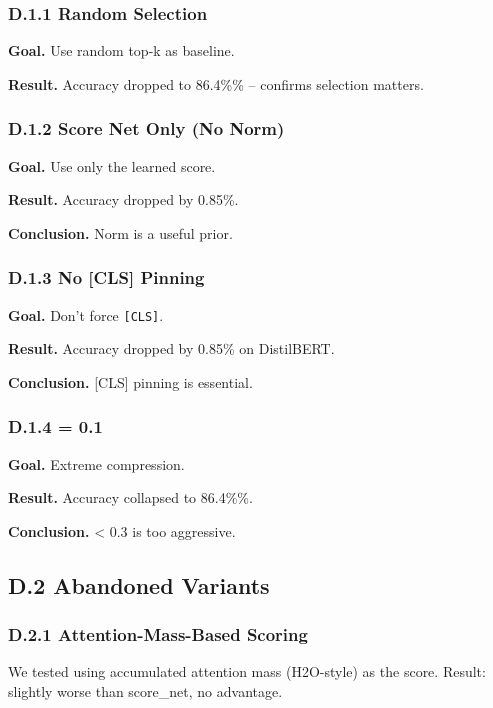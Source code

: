 \subsubsection{D.1.1 Random Selection}

\textbf{Goal.} Use random top-k as baseline.

\textbf{Result.} Accuracy dropped to 86.4\%\% -- confirms selection matters.

\subsubsection{D.1.2 Score Net Only (No Norm)}

\textbf{Goal.} Use only the learned score.

\textbf{Result.} Accuracy dropped by 0.85\%.

\textbf{Conclusion.} Norm is a useful prior.

\subsubsection{D.1.3 No [CLS] Pinning}

\textbf{Goal.} Don't force \texttt{[CLS]}.

\textbf{Result.} Accuracy dropped by 0.85\% on DistilBERT.

\textbf{Conclusion.} [CLS] pinning is essential.

\subsubsection{D.1.4   = 0.1}

\textbf{Goal.} Extreme compression.

\textbf{Result.} Accuracy collapsed to 86.4\%\%.

\textbf{Conclusion.}   < 0.3 is too aggressive.

\subsection{D.2 Abandoned Variants}

\subsubsection{D.2.1 Attention-Mass-Based Scoring}

We tested using accumulated attention mass (H2O-style) as the score. Result: 
slightly worse than score\_net, no advantage.

